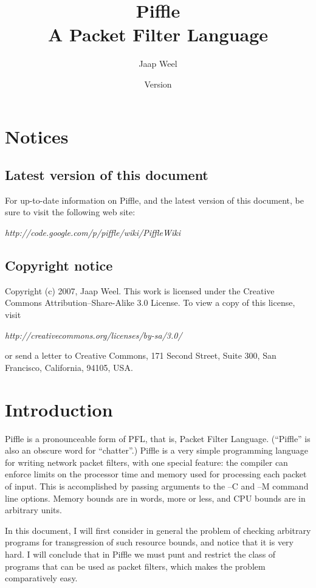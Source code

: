 \documentclass[a4paper,12pt]{scrreprt}
\title{Piffle\\ A Packet Filter Language}
\author{Jaap Weel}
\date{Version }
\begin{document}
\maketitle

\tableofcontents

\chapter{Notices}
\section{Latest version of this document}

For up-to-date information on Piffle, and the latest version of this
document, be sure to visit the following web site:

 \textit{http://code.google.com/p/piffle/wiki/PiffleWiki}

\section{Copyright notice}

Copyright (c) 2007, Jaap Weel. This work is licensed under
the Creative Commons Attribution--Share-Alike 3.0 License. To view a
copy of this license, visit

\textit{http://creativecommons.org/licenses/by-sa/3.0/} 

or send a
letter to Creative Commons, 171 Second Street, Suite 300, San
Francisco, California, 94105, USA.



\chapter{Introduction}

Piffle is a pronounceable form of PFL, that is, Packet Filter
Language. (``Piffle'' is also an obscure word for ``chatter''.) Piffle
is a very simple programming language for writing network packet
filters, with one special feature: the compiler can enforce limits on
the processor time and memory used for processing each packet of
input. This is accomplished by passing arguments to the --C and --M
command line options. Memory bounds are in words, more or less, and
CPU bounds are in arbitrary units.

In this document, I will first consider in general the problem of
checking arbitrary programs for transgression of such resource bounds,
and notice that it is very hard. I will conclude that in Piffle we must
punt and restrict the class of programs that can be used as packet
filters, which makes the problem comparatively easy.
\end{document}
